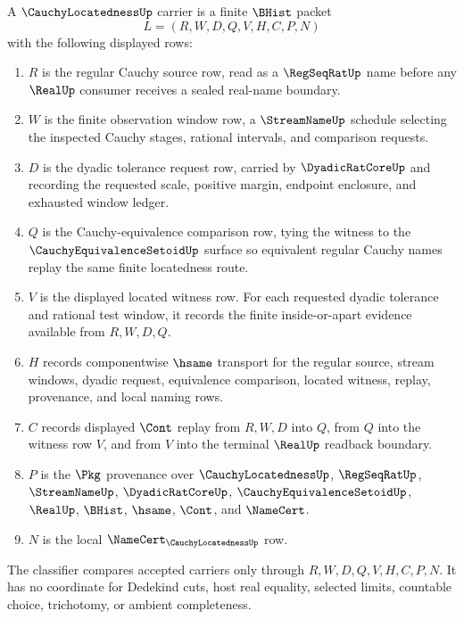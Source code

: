 \begin{definition}
\label{def:cauchy-locatedness-carrier}
A $\CauchyLocatednessUp$ carrier is a finite $\BHist$ packet
$$
L=(R,W,D,Q,V,H,C,P,N)
$$
with the following displayed rows:
\begin{enumerate}
\item $R$ is the regular Cauchy source row, read as a $\RegSeqRatUp$ name before any $\RealUp$ consumer receives a sealed real-name boundary.
\item $W$ is the finite observation window row, a $\StreamNameUp$ schedule selecting the inspected Cauchy stages, rational intervals, and comparison requests.
\item $D$ is the dyadic tolerance request row, carried by $\DyadicRatCoreUp$ and recording the requested scale, positive margin, endpoint enclosure, and exhausted window ledger.
\item $Q$ is the Cauchy-equivalence comparison row, tying the witness to the $\CauchyEquivalenceSetoidUp$ surface so equivalent regular Cauchy names replay the same finite locatedness route.
\item $V$ is the displayed located witness row. For each requested dyadic tolerance and rational test window, it records the finite inside-or-apart evidence available from $R,W,D,Q$.
\item $H$ records componentwise $\hsame$ transport for the regular source, stream windows, dyadic request, equivalence comparison, located witness, replay, provenance, and local naming rows.
\item $C$ records displayed $\Cont$ replay from $R,W,D$ into $Q$, from $Q$ into the witness row $V$, and from $V$ into the terminal $\RealUp$ readback boundary.
\item $P$ is the $\Pkg$ provenance over $\CauchyLocatednessUp$, $\RegSeqRatUp$, $\StreamNameUp$, $\DyadicRatCoreUp$, $\CauchyEquivalenceSetoidUp$, $\RealUp$, $\BHist$, $\hsame$, $\Cont$, and $\NameCert$.
\item $N$ is the local $\NameCert_{\CauchyLocatednessUp}$ row.
\end{enumerate}
The classifier compares accepted carriers only through $R,W,D,Q,V,H,C,P,N$. It has no coordinate for Dedekind cuts, host real equality, selected limits, countable choice, trichotomy, or ambient completeness.
\end{definition}

